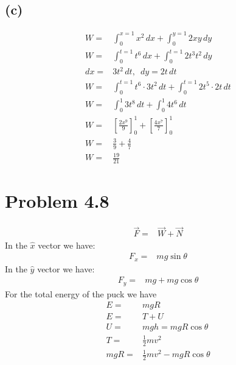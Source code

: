 \documentclass[12pt, a4paper]{article}
\begin{document}
\subsection*{(c)}
\begin{align*}
W =& \int_0^{x=1} x^2 \, dx + \int_0^{y=1} 2xy \, dy
\\
W =& \int_0^{t=1} t^6 \, dx + \int_0^{t=1} 2t^3t^2 \, dy
\\
dx =& 3t^2 \,dt, \,\,\, dy = 2t \,dt
\\
W =& \int_0^{t=1} t^6 \cdot 3t^2 \,dt + \int_0^{t=1} 2t^5 \cdot 2t \,dt
\\
W =& \int_0^1 3t^8 \,dt + \int_0^1 4t^6 \,dt
\\
W =& \left[ \frac{2x^9}{9} \right]_0^1 + 
   \left[ \frac{4x^7}{7}\right]_0^1
\\
W =& \frac{3}{9} + \frac{4}{7}
\\
W =& \boxed{\frac{19}{21}}
\end{align*}







\pagebreak
\section*{Problem 4.8}
\begin{align*}
\vec{F} =& \vec{W} + \vec{N}
\end{align*}
In the $\hat{x}$ vector we have:
\begin{align*}
F_x =&  mg\sin\theta
\end{align*}
In the $\hat{y}$ vector we have:
\begin{align*}
F_y =& mg + mg\cos\theta
\end{align*}
For the total energy of the puck we have
\begin{align*}
E =& mgR
\\
E =& T + U
\\
U =& mgh = mgR\cos\theta
\\
T =& \tfrac{1}{2}mv^2
\\
mgR =& \tfrac{1}{2}mv^2 - mgR\cos\theta 
\\
\end{align*}









\pagebreak
\end{document}

